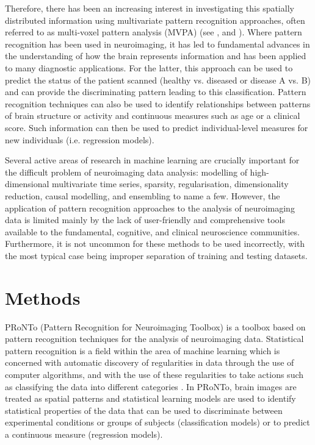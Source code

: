 Therefore, there has been an increasing interest in investigating this spatially distributed information using multivariate pattern recognition approaches, often referred to as  multi-voxel pattern analysis (MVPA) (see  \cite{Norman2006},  \cite{Haynes2006} and \cite{Pereira2009}). Where pattern recognition has been used in neuroimaging, it has led to fundamental advances in the understanding of how the brain represents information and has been applied to many diagnostic applications. For the latter, this approach can be used to predict the status of the patient scanned (healthy vs. diseased or disease A vs. B) and can provide the discriminating pattern leading to this classification. Pattern recognition techniques can also be used to identify relationships between patterns of brain structure or activity and continuous measures such as age or a clinical score. Such information can then be used to predict individual-level measures for new individuals (i.e. regression models).

Several active areas of research in machine learning are crucially important for the difficult problem of neuroimaging data analysis: modelling of high-dimensional multivariate time series, sparsity, regularisation, dimensionality reduction, causal modelling, and ensembling to name a few. However, the application of pattern recognition approaches to the analysis of neuroimaging data is limited mainly by the lack of user-friendly and comprehensive tools available to the fundamental, cognitive, and clinical neuroscience communities. Furthermore, it is not uncommon for these methods to be used incorrectly, with the most typical case being improper separation of training and testing datasets.


\section{Methods}

PRoNTo (Pattern Recognition for Neuroimaging Toolbox) is a toolbox based on pattern recognition techniques for the analysis of neuroimaging data. Statistical pattern recognition is a field within the area of machine learning which is concerned with automatic discovery of regularities in data through the use of computer algorithms, and with the use of these regularities to take actions such as classifying the data into different categories \cite{Bishop2006}. In PRoNTo, brain images are treated as spatial patterns and statistical learning models are used to identify statistical properties of the data that can be used to discriminate between experimental conditions or groups of subjects (classification models) or to predict a continuous measure (regression models).


